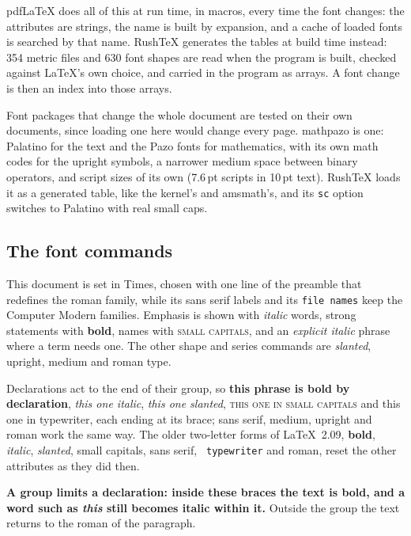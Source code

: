 \documentclass{article}
\numberwithin{equation}{section}
\theoremstyle{definition}
\theoremstyle{remark}
\begin{document}
pdfLaTeX does all of this at run time, in macros, every time the font changes: the
attributes are strings, the name is built by expansion, and a cache of loaded fonts is
searched by that name. RushTeX generates the tables at build time instead: 354 metric
files and 630 font shapes are read when the program is built, checked against \LaTeX's
own choice, and carried in the program as arrays. A font change is then an index into
those arrays.

Font packages that change the whole document are tested on their own documents, since
loading one here would change every page. mathpazo is one: Palatino for the text and
the Pazo fonts for mathematics, with its own math codes for the upright symbols, a
narrower medium space between binary operators, and script sizes of its own
(7.6\,pt scripts in 10\,pt text). RushTeX loads it as a generated table, like the
kernel's and amsmath's, and its \texttt{sc} option switches to Palatino with real small
caps.

\subsection{The font commands}

This document is set in Times, chosen with one line of the preamble that redefines the
roman family, while its sans serif \textsf{labels} and its \texttt{file names} keep the
Computer Modern families. Emphasis is shown with \emph{italic} words, strong statements
with \textbf{bold}, names with \textsc{small capitals}, and an \textit{explicit italic}
phrase where a term needs one. The other shape and series commands are
\textsl{slanted}, \textup{upright}, \textmd{medium} and \textrm{roman} type.

Declarations act to the end of their group, so {\bfseries this phrase is bold by
declaration}, {\itshape this one italic}, {\slshape this one slanted}, {\scshape this
one in small capitals} and {\ttfamily this one in typewriter}, each ending at its
brace; {\sffamily sans serif}, {\mdseries medium}, {\upshape upright} and
{\rmfamily roman} work the same way. The older two-letter forms of \LaTeX~2.09, {\bf
bold}, {\it italic}, {\sl slanted}, {\sc small capitals}, {\sf sans serif}, {\tt
typewriter} and {\rm roman}, reset the other attributes as they did then.

{\bfseries A group limits a declaration: inside these braces the text is bold, and a
word such as \emph{this} still becomes italic within it.} Outside the group the text
returns to the roman of the paragraph.
\end{document}
